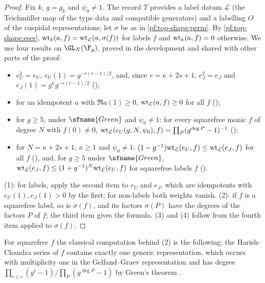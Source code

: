 \begin{proof}
Fix $k$, $g=g_k$ and $\psi_0\ne1$. The record $T$ provides a label datum $\mathcal L$ (the Teichm\"uller map of
the type data and compatible generators) and a labelling $O$ of the cuspidal representations; let $\sigma$ be as
in \cref{pf:top-shape:perm}. By \cref{pf:top-shape:eser}, $\mathrm{wt}_k(a,f)=\mathrm{wt}_{\mathcal L}(a,\sigma(f))$
for labels $f$ and $\mathrm{wt}_k(a,f)=0$ otherwise. We use four results on $\GL_N(\F_g)$, proved in the
development and shared with other parts of the proof:
\begin{itemize}
\item $e_U^2=e_U$, $e_U(1)=g^{-r(r-1)/2}$, and, since $r=\kappa+2s+1$, $e_J^2=e_J$ and $e_J(1)=g^{\kappa}g^{-r(r-1)/2}$
();
\item for an idempotent $a$ with $\Re a(1)\ge0$, $\mathrm{wt}_{\mathcal L}(a,f)\ge0$ for all $f$
();
\item for $g\ge5$, under $\sfname{Green}$ and $\psi_0\ne1$: for every squarefree monic $f$ of degree $N$ with
$f(0)\ne0$, $\mathrm{wt}_{\mathcal L}(e_U(g,N,\psi_0),f)=\prod_P(g^{\deg P}-1)^{-1}$
();
\item for $N=\kappa+2s+1$, $\kappa\ge1$ and $\psi_0\ne1$:
$(1-g^{-1})\mathrm{wt}_{\mathcal L}(e_U,f)\le\mathrm{wt}_{\mathcal L}(e_J,f)$ for all $f$
(), and, for $g\ge5$ under $\sfname{Green}$,
$\mathrm{wt}_{\mathcal L}(e_J,f)\le(1+g^{-1})^N\mathrm{wt}_{\mathcal L}(e_U,f)$ for squarefree labels $f$
().
\end{itemize}
(1): for labels, apply the second item to $e_U$ and $e_J$, which are idempotents with $e_U(1),e_J(1)>0$ by the
first; for non-labels both weights vanish. (2): if $f$ is a squarefree label, so is $\sigma(f)$, and its factors
$\sigma(P)$ have the degrees of the factors $P$ of $f$; the third item gives the formula. (3) and (4) follow from
the fourth item applied to $\sigma(f)$.
\end{proof}

For squarefree $f$ the classical computation behind (2) is the following: the Harish-Chandra series of $f$
contains exactly one generic representation, which occurs with multiplicity one in the Gelfand--Graev
representation \cite{GelfandGraev1962,Zelevinsky1981} and has degree
$\prod_{i\le r}(g^i-1)/\prod_P(g^{\deg P}-1)$ by Green's theorem \cite{Green1955}.

